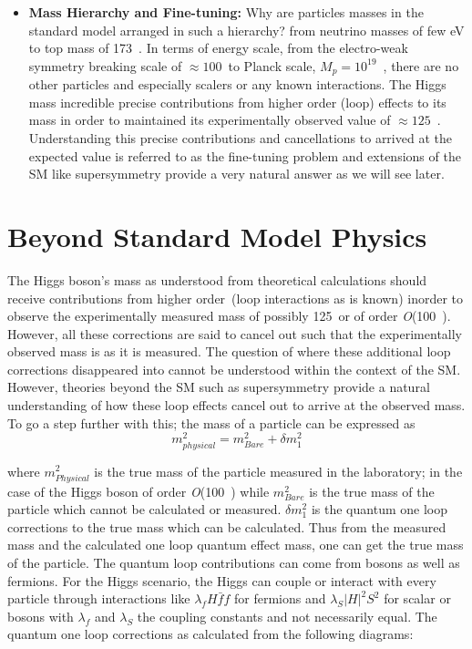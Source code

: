 \begin{itemize}
\item \textbf{Mass Hierarchy and Fine-tuning: }
Why are particles masses in the standard model arranged in such a hierarchy? from neutrino masses of few eV to top mass of 173~\GeV.
In terms of energy scale, from the electro-weak symmetry breaking scale of $\approx 100$~\GeV to Planck scale, $M_{p} = 10^{19}$~\GeV, there are no other particles and especially scalers  or any known interactions.
The Higgs mass  incredible precise  contributions from higher order (loop) effects to its mass in order to maintained its experimentally observed value of $\approx 125$~\GeV. Understanding this precise contributions and cancellations to arrived at the expected value is referred to as the fine-tuning problem and extensions of the SM like supersymmetry provide a very natural answer as we will see later.
\end{itemize}

\section{Beyond Standard Model Physics}
The Higgs boson's mass as understood from theoretical calculations should receive contributions from higher order~(loop interactions as is known) inorder to observe the experimentally measured mass of possibly 125~\GeV or of order \textit{O}(100~\GeV). However, all these corrections are said to cancel out such that the experimentally observed mass is as it is measured. The question of where these additional loop corrections disappeared into cannot be understood within the context of the SM. However, theories beyond the SM such as supersymmetry provide a natural understanding of how these loop effects cancel out to arrive at the observed mass. To go a step further with this; the mass of a particle can be expressed as 
\begin{equation}
 m^{2}_{physical} = m^{2}_{Bare} + \delta m^{2}_{1}
\end{equation}

where $m^{2}_{Physical}$ is the true mass of the particle measured in the laboratory; in the case of the Higgs boson of order \textit{O}(100~\GeV) while $m^{2}_{Bare}$ is the true mass of the particle which cannot be calculated or measured. $\delta m^{2}_{1}$ is the quantum one loop corrections to the true mass which can be calculated. Thus from the measured mass and the calculated  one loop quantum effect mass, one can get the true mass of the particle. The quantum loop contributions can come from bosons as well as fermions. For the Higgs scenario, the Higgs can couple or interact with every particle through interactions like $\lambda_{f}H\bar{f}f$ for fermions and $\lambda_{S}|H|^{2}S^{2}$ for scalar or bosons  with $\lambda_{f}$ and $\lambda_{S}$ the coupling constants and not necessarily equal. The quantum one loop corrections as calculated from the following diagrams:

